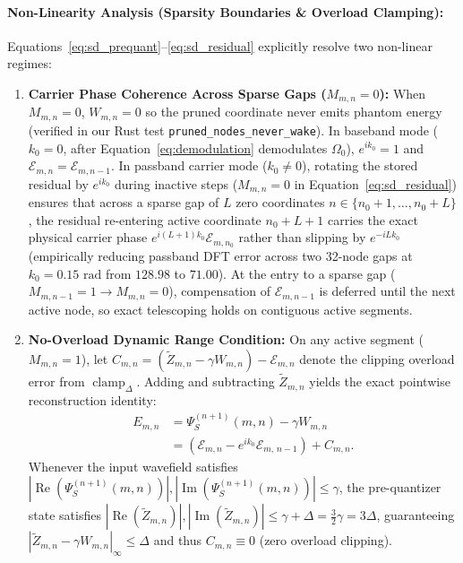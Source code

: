 \documentclass[10pt, twocolumn, a4paper]{article}
\begin{document}
\paragraph{Non-Linearity Analysis (Sparsity Boundaries \& Overload Clamping):}
Equations~\eqref{eq:sd_prequant}--\eqref{eq:sd_residual} explicitly resolve two non-linear regimes:
\begin{enumerate}
    \item \textbf{Carrier Phase Coherence Across Sparse Gaps ($M_{m,n} = 0$):} When $M_{m,n} = 0$, $W_{m,n} = 0$ so the pruned coordinate never emits phantom energy (verified in our Rust test \texttt{pruned\_nodes\_never\_wake}). In baseband mode ($k_0 = 0$, after Equation~\ref{eq:demodulation} demodulates $\Omega_0$), $e^{ik_0} = 1$ and $\mathcal{E}_{m,n} = \mathcal{E}_{m,n-1}$. In passband carrier mode ($k_0 \neq 0$), rotating the stored residual by $e^{ik_0}$ during inactive steps ($M_{m,n} = 0$ in Equation~\ref{eq:sd_residual}) ensures that across a sparse gap of $L$ zero coordinates $n \in \{n_0+1, \dots, n_0+L\}$, the residual re-entering active coordinate $n_0+L+1$ carries the exact physical carrier phase $e^{i(L+1)k_0}\mathcal{E}_{m,n_0}$ rather than slipping by $e^{-iLk_0}$ (empirically reducing passband DFT error across two 32-node gaps at $k_0 = 0.15\text{ rad}$ from $128.98$ to $71.00$). At the entry to a sparse gap ($M_{m,n-1}=1 \to M_{m,n}=0$), compensation of $\mathcal{E}_{m,n-1}$ is deferred until the next active node, so exact telescoping holds on contiguous active segments.
    \item \textbf{No-Overload Dynamic Range Condition:} On any active segment ($M_{m,n} = 1$), let $C_{m,n} = (\widetilde{Z}_{m,n} - \gamma W_{m,n}) - \mathcal{E}_{m,n}$ denote the clipping overload error from $\operatorname{clamp}_{\Delta}$. Adding and subtracting $\widetilde{Z}_{m,n}$ yields the exact pointwise reconstruction identity:
    \begin{equation}
    \begin{split}
    E_{m,n} &= \Psi_S^{(n+1)}(m,n) - \gamma W_{m,n} \\
    &= \left(\mathcal{E}_{m,n} - e^{i k_0} \mathcal{E}_{m, \, n-1}\right) + C_{m,n}.
    \end{split}
    \label{eq:sd_telescoping}
    \end{equation}
    Whenever the input wavefield satisfies $|\operatorname{Re}(\Psi_S^{(n+1)}(m,n))|, |\operatorname{Im}(\Psi_S^{(n+1)}(m,n))| \le \gamma$, the pre-quantizer state satisfies $|\operatorname{Re}(\widetilde{Z}_{m,n})|, |\operatorname{Im}(\widetilde{Z}_{m,n})| \le \gamma + \Delta = \frac{3}{2}\gamma = 3\Delta$, guaranteeing $|\widetilde{Z}_{m,n} - \gamma W_{m,n}|_{\infty} \le \Delta$ and thus $C_{m,n} \equiv 0$ (zero overload clipping).
\end{enumerate}
\end{document}
